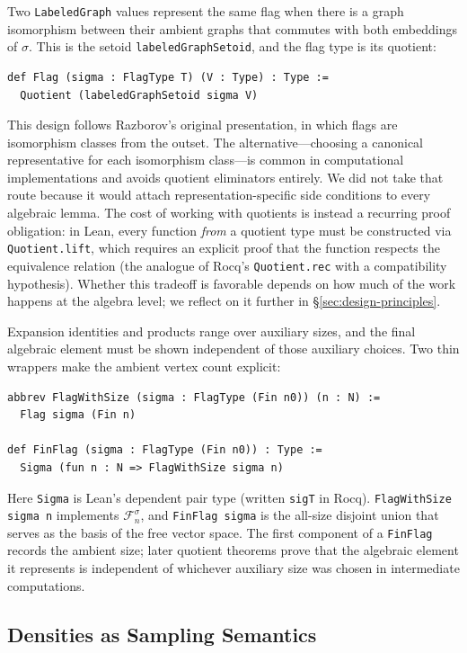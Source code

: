\documentclass{article}
\newcommand{\lean}[1]{\texttt{#1}}
\begin{document}
Two \lean{LabeledGraph} values represent the same flag when there is a graph
isomorphism between their ambient graphs that commutes with both embeddings of
$\sigma$.  This is the setoid \lean{labeledGraphSetoid}, and the flag type is
its quotient:
\begin{lstlisting}
def Flag (sigma : FlagType T) (V : Type) : Type :=
  Quotient (labeledGraphSetoid sigma V)
\end{lstlisting}
This design follows Razborov's original presentation, in which flags are
isomorphism classes from the outset.  The alternative---choosing a canonical
representative for each isomorphism class---is common in computational
implementations and avoids quotient eliminators entirely.  We did not take that
route because it would attach representation-specific side conditions to every
algebraic lemma.  The cost of working with quotients is instead a recurring
proof obligation: in Lean, every function \emph{from} a quotient type must be
constructed via \lean{Quotient.lift}, which requires an explicit proof that the
function respects the equivalence relation (the analogue of Rocq's
\lean{Quotient.rec} with a compatibility hypothesis).  Whether this tradeoff is
favorable depends on how much of the work happens at the algebra level; we
reflect on it further in \S\ref{sec:design-principles}.

Expansion identities and products range over auxiliary sizes, and the final
algebraic element must be shown independent of those auxiliary choices.  Two
thin wrappers make the ambient vertex count explicit:
\begin{lstlisting}
abbrev FlagWithSize (sigma : FlagType (Fin n0)) (n : N) :=
  Flag sigma (Fin n)

def FinFlag (sigma : FlagType (Fin n0)) : Type :=
  Sigma (fun n : N => FlagWithSize sigma n)
\end{lstlisting}
Here \lean{Sigma} is Lean's dependent pair type (written \lean{sigT} in Rocq).
\lean{FlagWithSize sigma n} implements $\mathcal{F}^\sigma_n$, and
\lean{FinFlag sigma} is the all-size disjoint union that serves as the basis
of the free vector space.  The first component of a \lean{FinFlag} records the
ambient size; later quotient theorems prove that the algebraic element it
represents is independent of whichever auxiliary size was chosen in
intermediate computations.

\subsection{Densities as Sampling Semantics}
\end{document}
